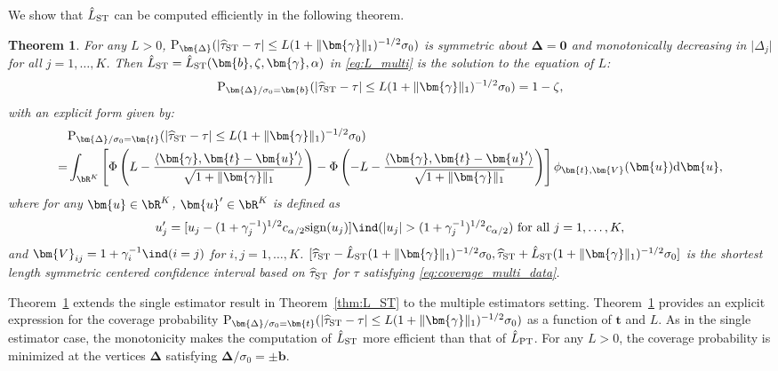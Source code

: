 \documentclass[11pt]{article}
\def\P{{\mathrm P}}
\def\d{{\mathrm d}}
\newcommand{\htau}{\widehat\tau}
\numberwithin{equation}{section}
\newtheorem{theorem}{Theorem}[section]
\theoremstyle{definition}
\begin{document}
We show that $\hat{L}_{\rm ST}$ can be computed efficiently in the following theorem.

\begin{theorem}\label{prop:L_ST_multi}
  For any $L > 0$, $\P_{\bm{\Delta}}(\lvert \htau_{\rm ST}- \tau \rvert \le L (1+\lVert \bm{\gamma} \rVert_1)^{-1/2} \sigma_0)$ is symmetric about $\bm{\Delta} = \bm{0}$ and monotonically decreasing in $\lvert \Delta_j \rvert$ for all $j=1,\ldots,K$. Then $\hat{L}_{\rm ST} = \hat{L}_{\rm ST}(\bm{b}, \zeta, \bm{\gamma}, \alpha)$ in \eqref{eq:L_multi} is the solution to the equation of $L$:
  \begin{align*}
    \P_{\bm{\Delta}/\sigma_0 = \bm{b}}(\lvert \htau_{\rm ST}- \tau \rvert \le L (1+\lVert \bm{\gamma} \rVert_1)^{-1/2} \sigma_0) = 1-\zeta,
  \end{align*}
  with an explicit form given by:
  \begin{align*}
    &\P_{\bm{\Delta}/\sigma_0 = \bm{t}}(\lvert \htau_{\rm ST}- \tau \rvert \le L (1+\lVert \bm{\gamma} \rVert_1)^{-1/2} \sigma_0) \\
    =& \int_{\bR^K} \left[\Phi\left(L - \frac{\langle \bm{\gamma}, \bm{t} - \bm{u}' \rangle}{\sqrt{1+\lVert \bm{\gamma} \rVert_1}}  \right) - \Phi\left(-L - \frac{\langle \bm{\gamma}, \bm{t} - \bm{u}' \rangle}{\sqrt{1+\lVert \bm{\gamma} \rVert_1}} \right)\right] \phi_{\bm{t}, \bm{V}}(\bm{u}) \d \bm{u},
  \end{align*}
  where for any $\bm{u} \in \bR^K$, $\bm{u}' \in \bR^K$ is defined as
  \[
    u_j' = [u_j  - (1+\gamma_j^{-1})^{1/2} c_{\alpha/2} {\rm sign}(u_j)] \ind(\lvert u_j \rvert > (1+\gamma_j^{-1})^{1/2} c_{\alpha/2}) \text{ for all } j=1,\ldots,K,
  \]
  and $\bm{V}_{ij} = 1 + \gamma_i^{-1} \ind (i=j)$ for $i,j=1,\ldots,K$. $[\htau_{\rm ST}- \hat{L}_{\rm ST} (1+\lVert \bm{\gamma} \rVert_1)^{-1/2} \sigma_0, \htau_{\rm ST}+ \hat{L}_{\rm ST} (1+\lVert \bm{\gamma} \rVert_1)^{-1/2} \sigma_0]$ is the shortest length symmetric centered confidence interval based on $\htau_{\rm ST}$ for $\tau$ satisfying \eqref{eq:coverage_multi_data}.
\end{theorem}

Theorem~\ref{prop:L_ST_multi} extends the single estimator result in Theorem~\ref{thm:L_ST} to the multiple estimators setting. Theorem~\ref{prop:L_ST_multi} provides an explicit expression for the coverage probability $\P_{\bm{\Delta}/\sigma_0 = \bm{t}}(\lvert \htau_{\rm ST}- \tau \rvert \le L (1+\lVert \bm{\gamma} \rVert_1)^{-1/2} \sigma_0)$ as a function of $\bm{t}$ and $L$. As in the single estimator case, the monotonicity makes the computation of $\hat{L}_{\rm ST}$ more efficient than that of $\hat{L}_{\rm PT}$. For any $L>0$, the coverage probability is minimized at the vertices $\bm{\Delta}$ satisfying $\bm{\Delta}/\sigma_0 = \pm \bm{b}$.
\end{document}
